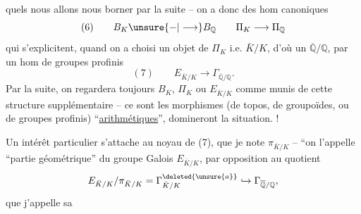 quels nous allons nous borner par la suite -- on a donc des hom canoniques
\[
(6)\qquad B_K\unsure{-|\longrightarrow}B_{\mathbb Q}\qquad\Pi_K\longrightarrow\Pi_{\mathbb Q}
\]
qui s'explicitent, quand on a choisi un objet de $\Pi_K$ i.e.  $\bar K/K$, d'où un $\overline{\mathbb Q}/\mathbb Q$, par un hom de groupes profinis
\[
(7)\qquad E_{\bar K/K}\longrightarrow\Gamma_{\overline{\mathbb Q}/\mathbb Q}.
\]
Par la suite, on regardera toujours $B_K$, $\Pi_K$ ou $E_{\bar K/K}$ comme munis de cette structure supplémentaire -- ce sont les morphismes (de topos, de groupoïdes, ou de groupes profinis) ``\uline{arithmétiques}'', domineront la situation. !

Un intérêt particulier s'attache au noyau de (7), que je note $\pi_{\bar K/K}$ -- ``on l'appelle ``partie géométrique'' du groupe Galois $E_{\bar K/K}$, par opposition au quotient
\[
E_{\bar K/K}/\pi_{\bar K/K}=\Gamma^{\deleted{\unsure{a}}}_{\bar K/K}\hookrightarrow\Gamma_{\overline{\mathbb Q}/\mathbb Q},
\]
que j'appelle sa
